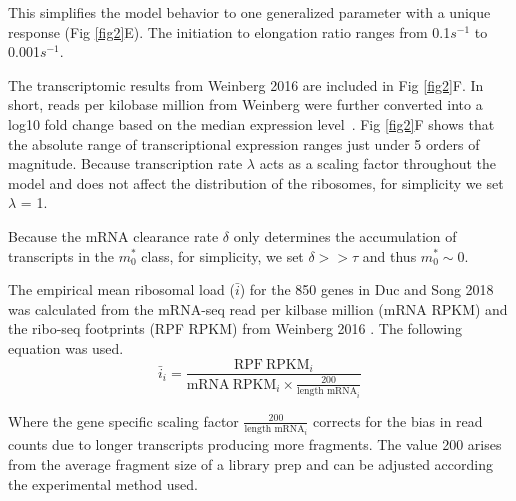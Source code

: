 \documentclass[10pt,letterpaper]{article}
\newcommand{\MRL}{\ensuremath{\bar{i}}\xspace}
\begin{document}
This simplifies the model behavior to one generalized parameter with a unique response (Fig \ref{fig2}E).
The initiation to elongation ratio ranges from 0.1$s^{-1}$ to 0.001$s^{-1}$.

The transcriptomic results from Weinberg 2016 are included in Fig \ref{fig2}F.
In short, reads per kilobase million from Weinberg were further converted into a log10 fold change based on the median expression level~\cite{RN29}.
Fig \ref{fig2}F shows that the absolute range of transcriptional expression ranges just under 5 orders of magnitude.
Because transcription rate $\lambda$ acts as a scaling factor throughout the model and does not affect the distribution of the ribosomes, for simplicity we set $\lambda$ = 1.

Because the mRNA clearance rate $\delta$ only determines the accumulation of transcripts in the  $m_0^*$  class, for simplicity, we set $\delta >> \tau$ and thus  $m_0^* \sim 0$.

The empirical mean ribosomal load (\MRL) for the 850 genes in Duc and Song 2018 was calculated from the mRNA-seq read per kilbase million (mRNA RPKM) and the ribo-seq footprints (RPF RPKM) from Weinberg  2016 \cite{RN29}.
The following equation was used.
\begin{equation}\label{eq:MRL}
  \MRL_i = \frac{\text{RPF} \: \text{RPKM}_i}{\text{mRNA} \:  \text{RPKM}_i  \times \frac{200}{\text{length mRNA}_i}}
\end{equation}

Where the gene specific scaling factor $\frac{200}{\text{length mRNA}_i}$ corrects for the bias in read counts due to longer transcripts producing more fragments.
The value 200 arises from the average fragment size of a library prep and can be adjusted according the experimental method used.



\end{document}

